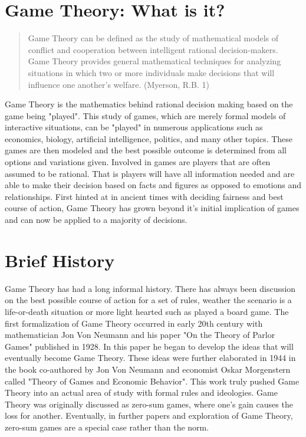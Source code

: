 \documentclass[12pt]{article}
\begin{document}
\pagestyle{fancy}  \chead{}
\rhead{\text{}} 
\lfoot{} \cfoot{} \rfoot{}

\section{Game Theory: What is it?}
 
\begin{quotation}
	 Game Theory can be defined as the study of mathematical models of
	conflict and cooperation between intelligent rational decision-makers.
	Game Theory provides general mathematical techniques for analyzing
	situations in which two or more individuals make decisions that will
	influence one another's welfare. (Myerson, R.B. 1)
\end{quotation}
	Game Theory is the mathematics behind rational decision making based on the game being "played". This study of games, which are merely formal models of interactive situations, can be "played" in numerous applications such as economics, biology, artificial intelligence, politics, and many other topics. These games are then modeled and the best possible outcome is determined from all options and variations given. Involved in games are players that are often assumed to be rational. That is players will have all information needed and are able to make their decision based on facts and figures as opposed to emotions and relationships. First hinted at in ancient times with deciding fairness and best course of action, Game Theory has grown beyond it's initial implication of games and can now be applied to a majority of decisions.
\section{Brief History}
	Game Theory has had a long informal history. There has always been discussion on the best possible course of action for a set of rules, weather the scenario is a life-or-death situation or more light hearted such as played a board game. The first formalization of Game Theory occurred in early 20th century with mathematician Jon Von Neumann and his paper "On the Theory of Parlor Games" published in 1928. In this paper he began to develop the ideas that will eventually become Game Theory. These ideas were further elaborated in 1944 in the book co-authored by Jon Von Neumann and economist Oskar Morgenstern called "Theory of Games and Economic Behavior". This work truly pushed Game Theory into an actual area of study with formal rules and ideologies. Game Theory was originally discussed as zero-sum games, where one's gain causes the loss for another. Eventually, in further papers and exploration of Game Theory, zero-sum games are a special case rather than the norm. 
\end{document}
